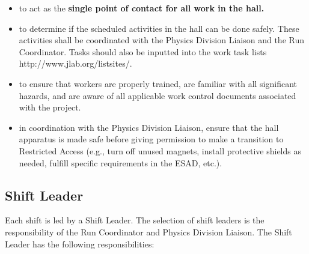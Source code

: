 \documentclass[10pt]{article}
\begin{document}
\begin{itemize}

\item  to act as the {\bf single point of contact for all work in the hall.}

\item to determine if the scheduled activities in the hall can be done safely.
These activities shall be coordinated with the Physics Division Liaison
and the Run Coordinator.   Tasks should also be inputted into the work task
lists {http://www.jlab.org/listsites/}.

\item to ensure that workers are properly trained, are familiar with all
significant hazards, and are aware of all applicable work control
documents associated with the project. 

\item in coordination with the Physics Division Liaison, 
ensure that the hall apparatus is made safe before giving permission to
make a transition to Restricted Access (e.g., turn off unused magnets,
install protective shields as needed, fulfill specific requirements in the
ESAD, etc.).

 
\end{itemize}

\subsection{Shift Leader}

Each shift is led by a Shift Leader. The selection of shift leaders
is the responsibility of the Run Coordinator and Physics Division Liaison.
The  Shift Leader has the following responsibilities: 
\end{document}
